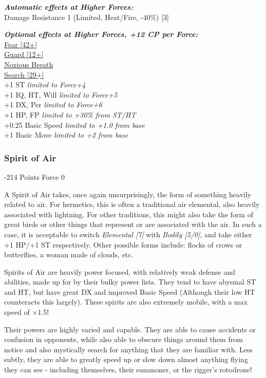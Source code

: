 \begin{multicols*}{3}
	\textbf{\textit{Automatic effects at Higher Forces:\\}}
	Damage Resistance 1 (Limited, Heat/Fire, -40\%) [3]
	
	\textbf{\textit{Optional effects at Higher Forces, +12 CP per Force:\\}}
	\hyperref[fear]{Fear [42+]}\\
	\hyperref[guard]{Guard [12+]}\\
	\hyperref[noxious_breath]{Noxious Breath}\\
	\hyperref[search]{Search [29+]}\\
	
	+1 ST \textit{limited to Force+4}\\
	+1 IQ, HT, Will \textit{limited to Force+5}\\
	+1 DX, Per \textit{limited to Force+6}\\
	+1 HP, FP \textit{limited to +30\% from ST/HT}\\
	+0.25 Basic Speed \textit{limited to +1.0 from base}\\
	+1 Basic Move \textit{limited to +2 from base}\\
	
	
	\subsubsection{Spirit of Air}
	\begin{flushright}
		-214 Points Force 0
	\end{flushright}
	
	A Spirit of Air takes, once again unsurprisingly, the form of something heavily related to air. For hermetics, this is often a traditional air elemental, also heavily associated with lightning. For other traditions, this might also take the form of great birds or other things that represent or are associated with the air. In such a case, it is acceptable to switch \textit{Elemental [7]} with \textit{Bodily [5/0]}, and take either +1 HP/+1 ST respectively. Other possible forms include: flocks of crows or butterflies, a woman made of clouds, etc.
	
	Spirits of Air are heavily power focused, with relatively weak defense and abilities, made up for by their bulky power lists. They tend to have abysmal ST and HT, but have great DX and improved Basic Speed (Although their low HT counteracts this largely). These spirits are also extremely mobile, with a max speed of \(\times\)1.5!
	
	Their powers are highly varied and capable. They are able to cause accidents or confusion in opponents, while also able to obscure things around them from notice and also mystically search for anything that they are familiar with. Less subtly, they are able to greatly speed up or slow down almost anything flying they can see - including themselves, their summoner, or the rigger's rotodrone!
	

\end{multicols*}
